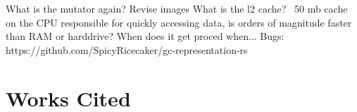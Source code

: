 \documentclass[index]{subfiles}
\begin{document}
What is the mutator again?
Revise images
What is the l2 cache?
~50 mb cache on the CPU responsible for quickly accessing data, is orders of magnitude faster than RAM or harddrive?
When does it get proced when...
Bugs: https://github.com/SpicyRicecaker/gc-representation-rs

\section{Works Cited}

\printbibliography
\end{document}
